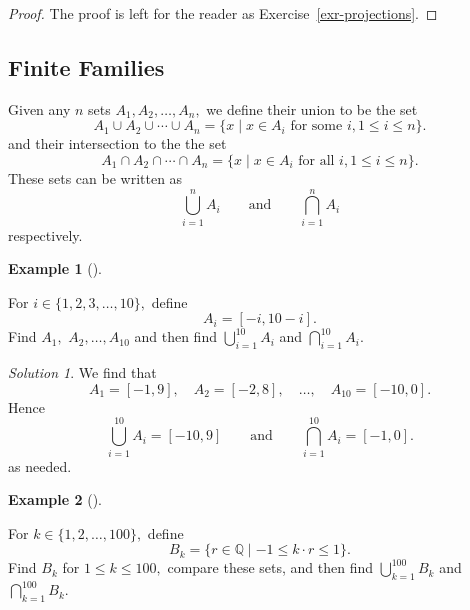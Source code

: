 \documentclass[
  letterpaper,
  10pt,
  reqno,
  twopage,
  openany]{book}
\theoremstyle{plain}
\theoremstyle{definition}
\theoremstyle{definition}
\theoremstyle{definition}
\newtheorem{example}{Example}[chapter]
\theoremstyle{plain}
\theoremstyle{plain}
\theoremstyle{remark}
\newtheorem*{solution}{Solution}
\begin{document}
\begin{proof}

The proof is left for the reader as Exercise~\ref{exr-projections}.

\end{proof}

\hypertarget{finite-families}{%
\subsection{Finite Families}\label{finite-families}}

Given any \(n\) sets \(A_1, A_2, \ldots, A_n,\) we define their union to
be the set \[
A_1 \cup A_2 \cup \cdots \cup A_n
=\{x\mid x\in A_i \text{ for some } i, 1\leq i \leq n\}.
\] and their intersection to the the set \[
A_1 \cap A_2 \cap \cdots \cap A_n
=\{x\mid x\in A_i \text{ for all } i, 1\leq i \leq n\}.
\] These sets can be written as \[
\bigcup_{i=1}^n A_i 
\qquad \text{and}\qquad  
\bigcap_{i=1}^n A_i 
\] respectively.

\leavevmode{}%
\begin{example}[]\label{exm-find-union}

For \(i\in \{1,2,3,\ldots, 10\},\) define \[
A_i=[-i,10-i].
\] Find \(A_1,\) \(A_2, \ldots, A_{10}\) and then find
\(\bigcup_{i=1}^{10} A_i\) and \(\bigcap_{i=1}^{10} A_i.\)

\end{example}

\begin{solution}

We find that \[
A_1=[-1,9], \quad 
A_2=[-2,8], \quad
\ldots, \quad 
A_{10}=[-10,0]. 
\] Hence \begin{equation}
\bigcup_{i=1}^{10} A_i=[-10,9]
\qquad  \text{and} \qquad 
\bigcap_{i=1}^{10} A_i=[-1,0].
\end{equation} as needed.

\end{solution}

\leavevmode{}%
\begin{example}[]\label{exm-find-cup-cap}

For \(k\in \{1,2,\ldots, 100\},\) define \[
B_k=\{r\in \mathbb{Q} \mid -1\leq k \cdot r \leq 1\}.
\] Find \(B_k\) for \(1\leq k\leq 100,\) compare these sets, and then
find \(\bigcup_{k=1}^{100} B_k\) and \(\bigcap_{k=1}^{100} B_k.\)

\end{example}
\end{document}
